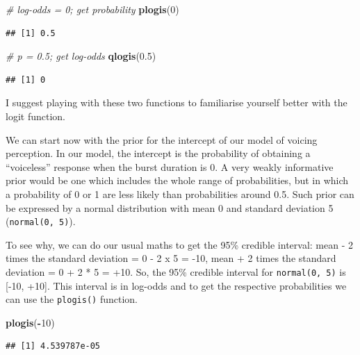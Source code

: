 \documentclass[
]{article}
\newenvironment{Shaded}{\begin{snugshade}}{\end{snugshade}}
\newcommand{\CommentTok}[1]{\textcolor[rgb]{0.56,0.35,0.01}{\textit{#1}}}
\newcommand{\DecValTok}[1]{\textcolor[rgb]{0.00,0.00,0.81}{#1}}
\newcommand{\FloatTok}[1]{\textcolor[rgb]{0.00,0.00,0.81}{#1}}
\newcommand{\KeywordTok}[1]{\textcolor[rgb]{0.13,0.29,0.53}{\textbf{#1}}}
\newcommand{\NormalTok}[1]{#1}
\newcommand{\OperatorTok}[1]{\textcolor[rgb]{0.81,0.36,0.00}{\textbf{#1}}}
\begin{document}
\begin{Shaded}
\begin{Highlighting}[]
\CommentTok{\# log{-}odds = 0; get probability}
\KeywordTok{plogis}\NormalTok{(}\DecValTok{0}\NormalTok{)}
\end{Highlighting}
\end{Shaded}

\begin{verbatim}
## [1] 0.5
\end{verbatim}

\begin{Shaded}
\begin{Highlighting}[]
\CommentTok{\# p = 0.5; get log{-}odds}
\KeywordTok{qlogis}\NormalTok{(}\FloatTok{0.5}\NormalTok{)}
\end{Highlighting}
\end{Shaded}

\begin{verbatim}
## [1] 0
\end{verbatim}

I suggest playing with these two functions to familiarise yourself
better with the logit function.

We can start now with the prior for the intercept of our model of
voicing perception. In our model, the intercept is the probability of
obtaining a ``voiceless'' response when the burst duration is 0. A very
weakly informative prior would be one which includes the whole range of
probabilities, but in which a probability of 0 or 1 are less likely than
probabilities around 0.5. Such prior can be expressed by a normal
distribution with mean 0 and standard deviation 5
(\texttt{normal(0,\ 5)}).

To see why, we can do our usual maths to get the 95\% credible interval:
mean - 2 times the standard deviation = 0 - 2 x 5 = -10, mean + 2 times
the standard deviation = 0 + 2 * 5 = +10. So, the 95\% credible interval
for \texttt{normal(0,\ 5)} is {[}-10, +10{]}. This interval is in
log-odds and to get the respective probabilities we can use the
\texttt{plogis()} function.

\begin{Shaded}
\begin{Highlighting}[]
\KeywordTok{plogis}\NormalTok{(}\OperatorTok{{-}}\DecValTok{10}\NormalTok{)}
\end{Highlighting}
\end{Shaded}

\begin{verbatim}
## [1] 4.539787e-05
\end{verbatim}
\end{document}
